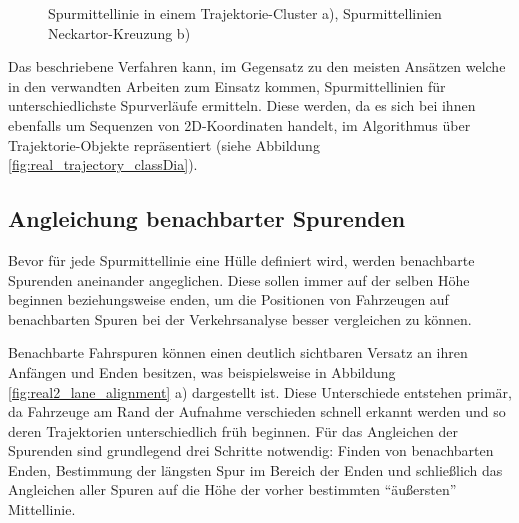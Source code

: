 \begin{figure}[H]
    \centering
    \qquad
    \caption[Ergebnisse Spurmittellinien-Bestimmung]{Spurmittellinie in einem Trajektorie-Cluster a), Spurmittellinien Neckartor-Kreuzung b)}
    \label{fig:real2_results_centerline_detection}
\end{figure}

Das beschriebene Verfahren kann, im Gegensatz zu den meisten Ansätzen welche in den verwandten Arbeiten zum Einsatz kommen,
Spurmittellinien für unterschiedlichste Spurverläufe ermitteln. 
Diese werden, da es sich bei ihnen ebenfalls um Sequenzen von 2D-Koordinaten handelt,
im Algorithmus über Trajektorie-Objekte repräsentiert (siehe Abbildung \ref{fig:real_trajectory_classDia}).

\subsection{Angleichung benachbarter Spurenden}

Bevor für jede Spurmittellinie eine Hülle definiert wird,
werden benachbarte Spurenden aneinander angeglichen. Diese sollen immer auf der selben Höhe beginnen
beziehungsweise enden, um die Positionen von Fahrzeugen auf benachbarten Spuren bei der
Verkehrsanalyse besser vergleichen zu können.

Benachbarte Fahrspuren können einen deutlich sichtbaren Versatz an ihren Anfängen
und Enden besitzen, was beispielsweise in Abbildung \ref{fig:real2_lane_alignment} a) dargestellt ist.
Diese Unterschiede entstehen
primär, da Fahrzeuge am Rand der Aufnahme verschieden schnell erkannt werden und so deren Trajektorien
unterschiedlich früh beginnen. Für das Angleichen der Spurenden sind grundlegend drei Schritte notwendig:
Finden von benachbarten Enden, Bestimmung der längsten Spur im Bereich der Enden und schließlich das
Angleichen aller Spuren auf die Höhe der vorher bestimmten ``äußersten'' Mittellinie.

